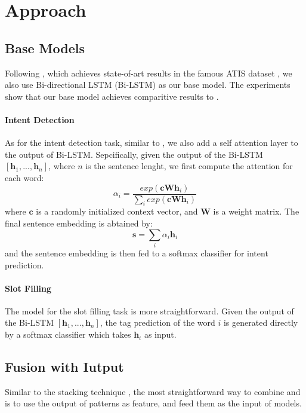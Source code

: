 \section{Approach}
\subsection{Base Models}
Following \cite{liu2016attention}, which achieves state-of-art results in the famous ATIS \NLU dataset \cite{hemphill1990atis}, we also use Bi-directional LSTM (Bi-LSTM) as our base \NN model. The experiments show that our base model achieves comparitive results to \cite{liu2016attention}.
\paragraph{Intent Detection}
As for the intent detection task, similar to \cite{liu2016attention}, we also add a self attention layer to the output of Bi-LSTM. Sepcifically, given the output of the Bi-LSTM $[\textbf{h}_1, ..., \textbf{h}_n]$, where $n$ is the sentence lenght, we first compute the attention for each word:
\begin{equation}
\alpha_i=\frac{exp(\textbf{cWh}_i)}{\sum_{i}{exp(\textbf{cWh}_i)}}
\end{equation}
where $\textbf{c}$ is a randomly initialized context vector, and $\textbf{W}$ is a weight matrix. The final sentence embedding is abtained by: 
\begin{equation}
\textbf{s} = \sum_{i}{\alpha_i\textbf{h}_i}
\end{equation}
and the sentence embedding is then fed to a softmax classifier for intent prediction.

\paragraph{Slot Filling}
The model for the slot filling task is more straightforward. Given the output of the Bi-LSTM $[\textbf{h}_1, ..., \textbf{h}_n]$, the tag prediction of the word $i$ is generated directly by a softmax classifier which takes $\textbf{h}_i$ as input.


\subsection{Fusion with Iutput}
\label{fusion_with_input}
Similar to the stacking technique \cite{wolpert1992stacked}, the most straightforward way to combine \RE and \NN is to use the output of \RE patterns as feature, and feed them as the input of \NN models.
